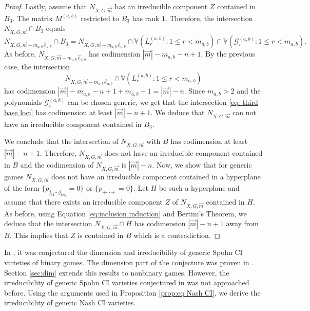 \documentclass[11pt]{amsart}
\numberwithin{equation}{section}
\theoremstyle{plain}
\numberwithin{theorem}{section}
\theoremstyle{definition}
\begin{document}
\begin{proof}
Lastly, assume that $ N_{X,G,\overrightarrow{m}}$ has an irreducible component $Z$ contained in $B_3$. The matrix $M^{(a,b)}$ restricted to $B_3$ has rank $1$. Therefore, the intersection $N_{X,G,\overrightarrow{m}} \cap B_3$ equals 
\begin{equation}\label{eq: third base loci}
N_{X,G,\overrightarrow{m}-m_{a,b}\overrightarrow{e}_{a,b}}\cap B_3 =  N_{X,G,\overrightarrow{m}-m_{a,b}\overrightarrow{e}_{a,b}}\cap\mathbb{V}(L_r^{(a,b)}:1\leq r<m_{a,b})\cap\mathbb{V}(\mathcal G_r^{(a,b)}:1\leq r<m_{a,b}).
\end{equation}
As before, $ N_{X,G,\overrightarrow{m}-m_{a,b}\overrightarrow{e}_{a,b}}$ has codimension $|\overrightarrow{m}|-m_{a,b}-n+1$. By the previous case, the intersection
\[
N_{X,G,\overrightarrow{m}-m_{a,b}\overrightarrow{e}_{a,b}}\cap\mathbb{V}(L_r^{(a,b)}:1\leq r<m_{a,b})
\]
has codimension $|\overrightarrow{m}|-m_{a,b}-n+1+m_{a,b}-1=|\overrightarrow{m}|-n$. Since 
$m_{a,b}>2$ and the polynomials $\mathcal G_r^{(a,b)}$ can be chosen generic, we get that the intersection \eqref{eq: third base loci} has codimension at least $|\overrightarrow{m}|-n+1$. We deduce that $N_{X,G,\overrightarrow{m}}$ can not have an irreducible component contained in $B_3$.

We conclude that the intersection of $N_{X,G,\overrightarrow{m}}$ with $B$ has codimension at least $|\overrightarrow{m}|-n+1$. Therefore, $N_{X,G,\overrightarrow{m}}$ does not have an irreducible component contained in $B$ and the codimension of $N_{X,G,\overrightarrow{m}}$ is $|\overrightarrow{m}|-n$.
Now, we show that for generic games  $N_{X,G,\overrightarrow{m}}$ does not have an irreducible component contained in a hyperplane of the form $\{p_{j_{11}\cdots j_{kn_k}}=0\}$ or $\{p_{+\cdots +}=0\}$.
Let $H$ be such a hyperplane and assume that there exists an irreducible component $Z$ of $N_{X,G,\overrightarrow{m}}$ contained in $H$. 
 As before, using Equation \eqref{eq:inclusion induction} and Bertini's Theorem,  we deduce that the intersection $N_{X,G,\overrightarrow{m}}\cap H$ has codimension $|\overrightarrow{m}|-n+1$ away from $B$. This implies that $Z$ is contained in $B$ which is a contradiction.
\end{proof}


In \cite[Conjecture 24]{portakal2022geometry}, it was conjectured the dimension and irreducibility of generic Spohn CI varieties of binary games. 
The dimension part of the conjecture was proven in \cite{portakal2024game}. Section \ref{sec:dim} extends this results to nonbinary games. However, the irreducibility of generic Spohn CI varieties conjectured in \cite[Conjecture 24]{portakal2022geometry} was not approached before. 
Using the arguments used in Proposition \ref{prop:eq Nash CI}, we derive the irreducibility of generic Nash CI varieties.
\end{document}
